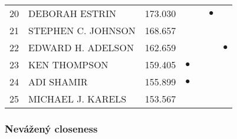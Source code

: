 \documentclass[12pt,titlepage]{report}
\begin{document}
\begin{center}
\begin{tabular}{|l|l|c|c|c|c|c|}
20 & DEBORAH ESTRIN & 173.030     &         &         &$\bullet$&         \\
21 & STEPHEN C. JOHNSON & 168.657 &         &         &         &         \\
22 & EDWARD H. ADELSON & 162.659  &         &         &         &$\bullet$\\
23 & KEN THOMPSON & 159.405       &$\bullet$&         &         &         \\
24 & ADI SHAMIR & 155.899         &$\bullet$&         &         &         \\
25 & MICHAEL J. KARELS & 153.567  &         &         &         &         \\
\hline
\end{tabular}
\end{center}

\subsubsection{Nevážený closeness}
\end{document}

